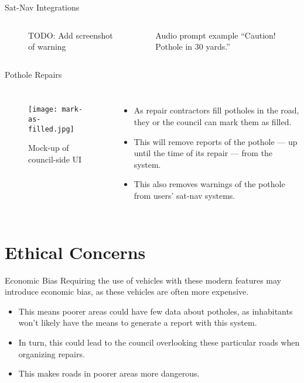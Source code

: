 \documentclass{beamer}
\begin{document}
\begin{frame}{Sat-Nav Integrations}
    \begin{columns}
        \begin{figure}
            \caption{TODO: Add screenshot of warning}
        \end{figure}


        \begin{exampleblock}{Audio prompt example}
            ``Caution! Pothole in 30 yards.''
        \end{exampleblock}
    \end{columns}
\end{frame}

\begin{frame}{Pothole Repairs}
    \begin{columns}

        \begin{figure}
            \texttt{[image: mark-as-filled.jpg]}
            \caption{Mock-up of council-side UI}
        \end{figure}


        \begin{itemize}
            \item As repair contractors fill potholes in the road, they or the council can mark them as filled.
            \item This will remove reports of the pothole --- up until the time of its repair --- from the system.
            \item This also removes warnings of the pothole from users' sat-nav systems.
        \end{itemize}
    \end{columns}
\end{frame}

\section{Ethical Concerns}

\begin{frame}{Economic Bias}
Requiring the use of vehicles with these modern features may introduce economic bias, as these vehicles are often more expensive.

\begin{itemize}
    \item This means poorer areas could have few data about potholes, as inhabitants won't likely have the means to generate a report with this system.
    \item In turn, this could lead to the council overlooking these particular roads when organizing repairs.
    \item This makes roads in poorer areas more dangerous.
\end{itemize}
\end{frame}
\end{document}
